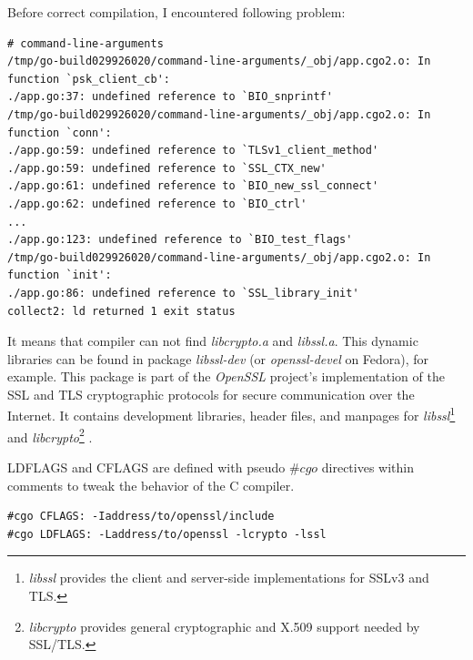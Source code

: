 \documentclass[
  12pt, 
  digital, %
  notable,   %
  nolof,     %
  nolot,     %
]{fithesis3}
\begin{document}
Before correct compilation, I encountered following problem:
\begin{lstlisting}
# command-line-arguments
/tmp/go-build029926020/command-line-arguments/_obj/app.cgo2.o: In function `psk_client_cb':
./app.go:37: undefined reference to `BIO_snprintf'
/tmp/go-build029926020/command-line-arguments/_obj/app.cgo2.o: In function `conn':
./app.go:59: undefined reference to `TLSv1_client_method'
./app.go:59: undefined reference to `SSL_CTX_new'
./app.go:61: undefined reference to `BIO_new_ssl_connect'
./app.go:62: undefined reference to `BIO_ctrl'
...
./app.go:123: undefined reference to `BIO_test_flags'
/tmp/go-build029926020/command-line-arguments/_obj/app.cgo2.o: In function `init':
./app.go:86: undefined reference to `SSL_library_init'
collect2: ld returned 1 exit status
\end{lstlisting}

It means that compiler can not find \textit{libcrypto.a} and \textit{libssl.a}. This dynamic libraries can be found in package \textit{libssl-dev}  (or 
\textit{openssl-devel} on Fedora), for example. This package is part of the \textit{OpenSSL} project's implementation of the SSL and TLS cryptographic protocols for secure communication over the Internet. It contains development libraries, header files, and manpages for \textit{libssl}\footnote{\textit{libssl} provides the client and server-side implementations for SSLv3 and TLS.} and \textit{libcrypto}\footnote{\textit{libcrypto} provides general cryptographic and X.509 support needed by SSL/TLS.} \cite{opensslgit,linux-man}. 

LDFLAGS and CFLAGS are defined with pseudo $\#cgo$ directives within comments to tweak the behavior of the C compiler. 
\begin{lstlisting}
#cgo CFLAGS: -Iaddress/to/openssl/include
#cgo LDFLAGS: -Laddress/to/openssl -lcrypto -lssl
\end{lstlisting}

\end{document}
